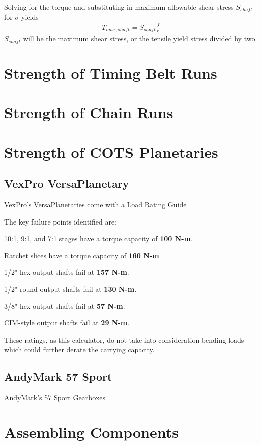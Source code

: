 \documentclass[10pt,letterpaper]{article}
\begin{document}
	Solving for the torque and substituting in maximum allowable shear stress $S_{shaft}$ for $\sigma$ yields
	\begin{align}
		T_{max,shaft} = S_{shaft} \frac{J}{r}
	\end{align}
	$S_{shaft}$ will be the maximum shear stress, or the tensile yield stress divided by two.

\section{Strength of Timing Belt Runs}

\section{Strength of Chain Runs}

\section{Strength of COTS Planetaries}
	\subsection{VexPro VersaPlanetary}
	\href{https://www.vexrobotics.com/versaplanetary.html}{\underline{VexPro's VersaPlanetaries}} come with a \href{https://docs.google.com/gview?url=http://link.vex.com/vexpro/pdf/VersaPlanetary-LoadRatings}{\underline{Load Rating Guide}}

	The key failure points identified are:
	\begin{asparaitem}
		\item 10:1, 9:1, and 7:1 stages have a torque capacity of \textbf{100 N-m}.
		\item Ratchet slices have a torque capacity of \textbf{160 N-m}.
		\item 1/2" hex output shafts fail at \textbf{157 N-m}.
		\item 1/2" round output shafts fail at \textbf{130 N-m}.
		\item 3/8" hex output shafts fail at \textbf{57 N-m}.
		\item CIM-style output shafts fail at \textbf{29 N-m}.
	\end{asparaitem}

	These ratings, as this calculator, do not take into consideration bending loads which could further derate the carrying capacity.

	\subsection{AndyMark 57 Sport}
	\href{https://www.andymark.com/products/57-sport-options}{\underline{AndyMark's 57 Sport Gearboxes}} 

\section{Assembling Components}
\end{document}
